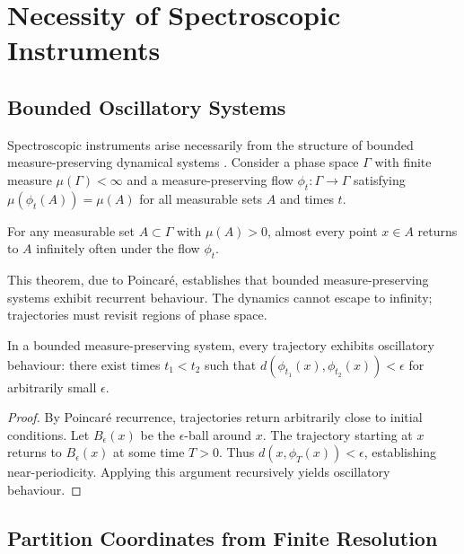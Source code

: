 \section{Necessity of Spectroscopic Instruments}
\label{sec:instruments}

\subsection{Bounded Oscillatory Systems}

Spectroscopic instruments arise necessarily from the structure of bounded measure-preserving dynamical systems \citep{sachikonye2024instruments}. Consider a phase space $\Gamma$ with finite measure $\mu(\Gamma) < \infty$ and a measure-preserving flow $\phi_t: \Gamma \to \Gamma$ satisfying $\mu(\phi_t(A)) = \mu(A)$ for all measurable sets $A$ and times $t$.

\begin{theorem}
\label{thm:poincare}
For any measurable set $A \subset \Gamma$ with $\mu(A) > 0$, almost every point $x \in A$ returns to $A$ infinitely often under the flow $\phi_t$.
\end{theorem}

This theorem, due to Poincaré, establishes that bounded measure-preserving systems exhibit recurrent behaviour. The dynamics cannot escape to infinity; trajectories must revisit regions of phase space.

\begin{theorem}
\label{thm:oscillatory}
In a bounded measure-preserving system, every trajectory exhibits oscillatory behaviour: there exist times $t_1 < t_2$ such that $d(\phi_{t_1}(x), \phi_{t_2}(x)) < \epsilon$ for arbitrarily small $\epsilon$.
\end{theorem}

\begin{proof}
By Poincaré recurrence, trajectories return arbitrarily close to initial conditions. Let $B_\epsilon(x)$ be the $\epsilon$-ball around $x$. The trajectory starting at $x$ returns to $B_\epsilon(x)$ at some time $T > 0$. Thus $d(x, \phi_T(x)) < \epsilon$, establishing near-periodicity. Applying this argument recursively yields oscillatory behaviour.
\end{proof}

\subsection{Partition Coordinates from Finite Resolution}

